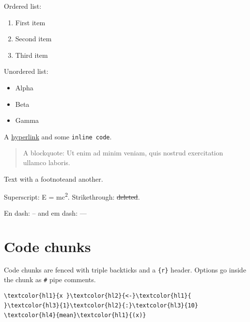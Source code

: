 \documentclass[11pt]{article}
\begin{document}
Ordered list:

\begin{enumerate}
\item First item


\item Second item


\item Third item


\end{enumerate}

Unordered list:

\begin{itemize}
\item Alpha


\item Beta


\item Gamma


\end{itemize}

A \href{https://example.com}{hyperlink} and some \texttt{inline code}.

\begin{quote}
A blockquote: Ut enim ad minim veniam, quis nostrud
exercitation ullamco laboris.

\end{quote}

Text with a footnote\footnotemark[1] and another\footnotemark[2].

Superscript: E = mc\textsuperscript{2}. Strikethrough: \sout{deleted}.

En dash: -- and em dash: ---

\section*{Code chunks}
\label{code-chunks}

Code chunks are fenced with triple backticks and a \texttt{\{r\}} header. Options go inside the chunk as \texttt{\#\textbar{}} pipe comments.


\begin{srccode}
\begin{Verbatim}[commandchars=\\\{\}]
\textcolor{hl1}{x }\textcolor{hl2}{<-}\textcolor{hl1}{ }\textcolor{hl3}{1}\textcolor{hl2}{:}\textcolor{hl3}{10}
\textcolor{hl4}{mean}\textcolor{hl1}{(x)}
\end{Verbatim}
\end{srccode}
\end{document}
